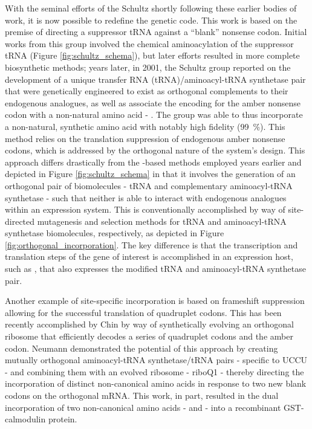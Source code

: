 \begin{refsection}
With the seminal efforts of the Schultz \cite{Noren1989} shortly
following these earlier bodies of work, it is now possible to redefine the
genetic code. This work is based on the premise of directing a suppressor tRNA
against a ``blank'' nonsense codon. Initial works from this group involved the
chemical aminoacylation of the suppressor tRNA  (Figure
\ref{fig:schultz_schema}), but later efforts resulted in more complete
biosynthetic methods; years later, in 2001, the Schultz group reported on the
development of a unique transfer RNA (tRNA)/aminoacyl-tRNA synthetase pair that
were genetically engineered to exist as orthogonal complements to their
endogenous analogues, as well as associate the encoding for the amber nonsense
codon with a non-natural amino acid - . The
group was able to thus incorporate a non-natural, synthetic amino acid with
notably high fidelity (\SI{99}{\percent}).\cite{Wang2001} This method relies on
the translation suppression of endogenous amber nonsense codons, which is
addressed by the orthogonal nature of the system's design. This approach differs
drastically from the -based methods employed years earlier and
depicted in Figure \ref{fig:schultz_schema} in that it involves the generation
of an orthogonal pair of biomolecules - tRNA and complementary aminoacyl-tRNA
synthetase - such that neither is able to interact with endogenous analogues
within an expression system. This is conventionally accomplished by way of
site-directed mutagenesis and  selection methods for tRNA and
aminoacyl-tRNA synthetase biomolecules, respectively, as depicted in Figure
\ref{fig:orthogonal_incorporation}. The key difference is that the transcription
and translation steps of the gene of interest is accomplished in an expression
host, such as , that also expresses the modified tRNA and
aminoacyl-tRNA synthetase pair.

Another example of site-specific incorporation is based on frameshift
suppression allowing for the successful  translation of
quadruplet codons. This has been recently accomplished by Chin  by
way of synthetically evolving an orthogonal ribosome that efficiently decodes a
series of quadruplet codons and the amber codon.\cite{Neumann2010,Rackham2005}
Neumann demonstrated the potential of this approach by creating mutually
orthogonal aminoacyl-tRNA synthetase/tRNA pairs - specific to UCCU - and
combining them with an evolved ribosome - riboQ1 - thereby directing the
incorporation of distinct non-canonical amino acids in response to two new blank
codons on the orthogonal mRNA.\cite{Neumann2010} This work, in part, resulted
in the dual incorporation of two non-canonical amino acids -
 and
 - into a
recombinant GST-calmodulin protein.


\end{refsection}
